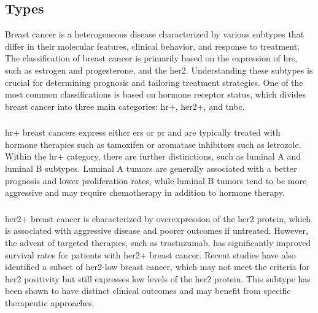 \subsection{Types}
\label{sec:brca_types}

Breast cancer is a heterogeneous disease characterized by various subtypes that
differ in their molecular features, clinical behavior, and response to
treatment\supercite{harbeck_breast_2019}.
The classification of breast cancer is primarily based on the expression of
\glspl{hr}, such as estrogen and progesterone, and the \gls{her2}.
Understanding these subtypes is crucial for determining prognosis and tailoring
treatment strategies.
One of the most common classifications is based on hormone receptor status,
which divides breast cancer into three main categories: \gls{hr+}, \gls{her2+},
and \gls{tnbc}\supercite{clusan_basic_2023}.

\subsubsection{}
\gls{hr+} breast cancers express either \glspl{er} or \gls{pr} and
are typically treated with hormone therapies such as tamoxifen or aromatase
inhibitors such as letrozole\supercite{geyer_molecular_2012}.
Within the \gls{hr+} category, there are further distinctions, such as luminal
A and luminal B subtypes.
Luminal A tumors are generally associated with a better prognosis and lower
proliferation rates, while luminal B tumors tend to be more aggressive and may
require chemotherapy in addition to hormone
therapy\supercite{geyer_molecular_2012}.

\subsubsection{}
\Gls{her2+} breast cancer is characterized by overexpression of the \gls{her2}
protein, which is associated with aggressive disease and poorer outcomes if
untreated.
However, the advent of targeted therapies, such as trastuzumab, has
significantly improved survival rates for patients with \gls{her2+} breast
cancer\supercite{modi_antitumor_2020}.
Recent studies have also identified a subset of \gls{her2}-low breast cancer,
which may not meet the criteria for \gls{her2} positivity but still expresses
low levels of the \gls{her2} protein.
This subtype has been shown to have distinct clinical outcomes and may benefit
from specific therapeutic
approaches\supercite{won_clinical_2022,mutai_prognostic_2021}.

